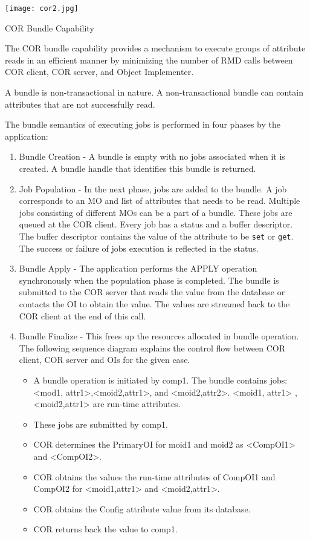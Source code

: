 \newpage
\begin{center}
\texttt{[image: cor2.jpg]}
\end{center}



\begin{flushleft}
\begin{Desc}
\item
[COR Bundle Capability]\end{Desc}
The COR bundle capability provides a mechanism to execute groups of attribute reads in an efficient manner by minimizing the number of RMD calls between 
COR client, COR server, and Object Implementer.  
\par
A bundle is non-transactional in nature. A non-transactional bundle can contain attributes that are not successfully read. 
\par
The bundle semantics of executing jobs is performed in four phases by the application:
\begin{enumerate}
\item
Bundle Creation - A bundle is empty with no jobs associated when it is created. A bundle handle that identifies this bundle is returned.
\item
Job Population -  In the next phase, jobs are added to the bundle. A job corresponds to an MO and list of attributes that needs to be read. 
Multiple jobs consisting of different MOs can be a part of a bundle. These jobs are queued at the COR client. Every job has a status and
a buffer descriptor. The buffer descriptor contains the value of the attribute to be {\tt{set}} or {\tt{get}}. The success or failure of jobs 
 execution is reflected in the status.

\item
Bundle Apply - The application performs the APPLY operation synchronously when the population phase is completed. The bundle is submitted to the COR 
server that reads the value from the database or contacts the OI to obtain the value. The values are streamed back to the COR client at the end of 
this call.  

\item
Bundle Finalize - This frees up the resources allocated in bundle operation.
The following sequence diagram explains the control flow between COR client, COR server and OIs for the given case. 
\begin{itemize}
\item
A bundle operation is initiated by comp1. The bundle contains jobs: <mod1, attr1>,<moid2,attr1>, and <moid2,attr2>. <moid1, attr1> , 
<moid2,attr1> are run-time attributes.  
\item
These jobs are submitted by comp1.
\item
COR determines the PrimaryOI for moid1 and moid2 as <CompOI1> and <CompOI2>.
\item
COR obtains the values the run-time attributes of CompOI1 and CompOI2 for <moid1,attr1> and <moid2,attr1>.
\item
COR obtains the Config attribute value from its database. 
\item
COR returns back the value to comp1.
\end{itemize}


\end{enumerate}
\end{flushleft}
